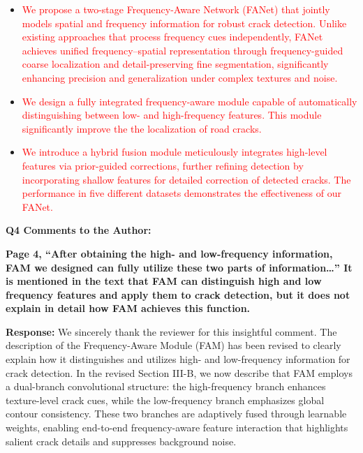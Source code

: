 \documentclass[lettersize,journal,onecolumn,12pt]{IEEEtran}
\begin{document}
\begin{itemize}
    
    
    \item \textcolor{red}{We propose a two-stage Frequency-Aware Network (FANet) that jointly models spatial and frequency information for robust crack detection. 
    Unlike existing approaches that process frequency cues independently, FANet achieves unified frequency–spatial representation through frequency-guided coarse localization and detail-preserving fine segmentation, 
    significantly enhancing precision and generalization under complex textures and noise.}

    \item \textcolor{red}{We design a fully integrated frequency-aware module capable of automatically distinguishing between low- and high-frequency features. This module significantly improve the the localization of road cracks.}
    
    \item \textcolor{red}{We introduce a hybrid fusion module meticulously integrates high-level features via prior-guided corrections, further refining detection by incorporating shallow features for detailed correction of detected cracks. The performance in five different datasets demonstrates the effectiveness of our FANet.}\\ [10pt]
    
\end{itemize}












{\color{BlueGreen} \textbf{Q4 Comments to the Author:}

\textbf{Page 4, “After obtaining the high- and low-frequency information, FAM we designed can fully utilize these two parts of information…”
It is mentioned in the text that FAM can distinguish high and low frequency features and apply them to crack detection, but it does not explain in detail how FAM achieves this function.}} 

\textbf{Response:}
We sincerely thank the reviewer for this insightful comment. 
The description of the Frequency-Aware Module (FAM) has been revised to clearly explain how it distinguishes and utilizes high- and low-frequency information for crack detection. 
In the revised Section III-B, we now describe that FAM employs a dual-branch convolutional structure: the high-frequency branch enhances texture-level crack cues, while the low-frequency branch emphasizes global contour consistency. 
These two branches are adaptively fused through learnable weights, enabling end-to-end frequency-aware feature interaction that highlights salient crack details and suppresses background noise. 
\end{document}
